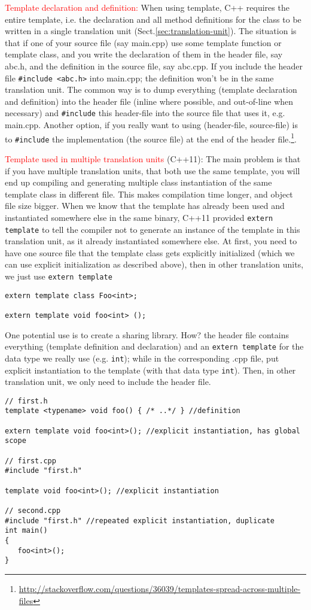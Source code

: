 \textcolor{red}{Template declaration and definition:} When using template, C++
requires the entire template, i.e. the declaration and all method definitions
for the class to be written in a single translation unit
(Sect.\ref{sec:translation-unit}). The situation is that if one of your source
file (say main.cpp) use some template function or template class, and you write
the declaration of them in the header file, say abc.h, and the definition in the
source file, say abc.cpp. If you include the header file \verb!#include <abc.h>!
into main.cpp; the definition won't be in the same translation unit. The common
way is to dump everything (template declaration and definition) into the header
file (inline where possible, and out-of-line when necessary) and \verb!#include!
this header-file into the source file that uses it, e.g. main.cpp.
Another option, if you really want to using (header-file, source-file) is to
\verb!#include! the implementation (the source file) at the end of the header
file.\footnote{\url{http://stackoverflow.com/questions/36039/templates-spread-across-multiple-files}}.


\textcolor{red}{Template used in multiple translation units} (C++11): The main
problem is that if you have multiple translation units, that both use the same template,
you will end up compiling and generating multiple class instantiation of the same
template class in different file. This makes compilation time longer, and object
file size bigger.  When we know that the template has already been used and
instantiated somewhere else in the same binary, C++11 provided \verb!extern!
\verb!template! to tell the compiler not to generate an instance of the template
in this translation unit, as it already instantiated somewhere else. At first, you
need to have one source file that the template class gets explicitly initialized
(which we can use explicit initialization as described above), then in other
translation units, we just use \verb!extern template!
\begin{lstlisting}
extern template class Foo<int>;

extern template void foo<int> ();
\end{lstlisting}
One potential use is to create a sharing library. How? the header file contains
everything (template definition and declaration) and an \verb!extern template!
for the data type we really use (e.g. \verb!int!); while in the corresponding
.cpp file, put explicit instantiation to the template (with that data type
\verb!int!). Then, in other translation unit, we only need to include the header
file.
\begin{lstlisting}
// first.h
template <typename> void foo() { /* ..*/ } //definition

extern template void foo<int>(); //explicit instantiation, has global scope

// first.cpp
#include "first.h"

template void foo<int>(); //explicit instantiation

// second.cpp
#include "first.h" //repeated explicit instantiation, duplicate
int main()
{
   foo<int>();
}
\end{lstlisting}

